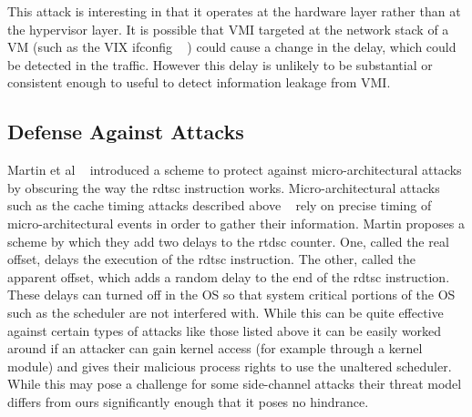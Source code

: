 This attack is interesting in that it operates at the hardware layer rather than at the hypervisor layer. It is possible that VMI targeted at the network stack of a VM (such as the VIX ifconfig ~\cite{hay_forensics_2008} ) could cause a change in the delay, which could be detected in the traffic. However this delay is unlikely to be substantial or consistent enough to useful to detect information leakage from VMI.

\subsection{Defense Against Attacks}

Martin et al ~\cite{martin2012timewarp} introduced a scheme to protect against micro-architectural attacks by obscuring the way the rdtsc instruction works. Micro-architectural attacks such as the cache timing attacks described above ~\cite{zhang_cross-vm_2012,ristenpart_hey_2009,zhang_homealone:_2011} rely on precise timing of micro-architectural events in order to gather their information. Martin proposes a scheme by which they add two delays to the rtdsc counter. One, called the real offset, delays the execution of the rdtsc instruction. The other, called the apparent offset, which adds a random delay to the end of the rdtsc instruction. These delays can turned off in the OS so that system critical portions of the OS such as the scheduler are not interfered with.  While this can be quite effective against certain types of attacks like those listed above it can be easily worked around if an attacker can gain kernel access (for example through a kernel module) and gives their malicious process rights to use the unaltered scheduler. While this may pose a challenge for some side-channel attacks their threat model differs from ours significantly enough that it poses no hindrance.

